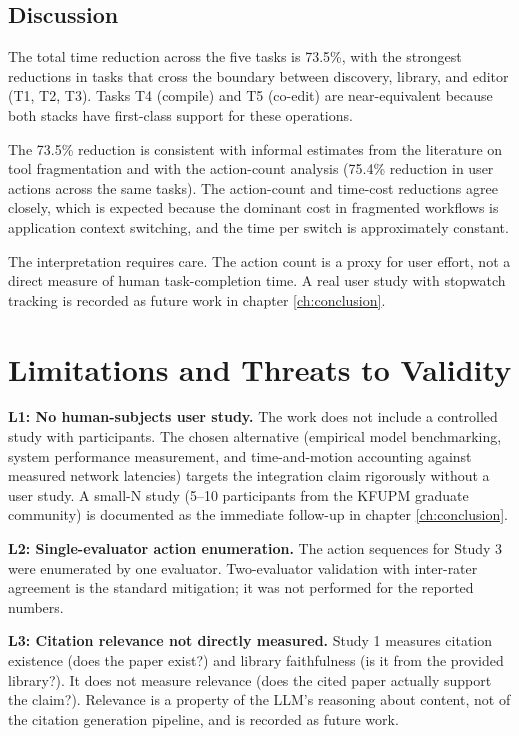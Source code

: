 \subsection{Discussion}

The total time reduction across the five tasks is 73.5\%, with the strongest reductions in tasks that cross the boundary between discovery, library, and editor (T1, T2, T3). Tasks T4 (compile) and T5 (co-edit) are near-equivalent because both stacks have first-class support for these operations.

The 73.5\% reduction is consistent with informal estimates from the literature on tool fragmentation \cite{springer2024fragmentation, khalifa2024aiwriting} and with the action-count analysis (75.4\% reduction in user actions across the same tasks). The action-count and time-cost reductions agree closely, which is expected because the dominant cost in fragmented workflows is application context switching, and the time per switch is approximately constant.

The interpretation requires care. The action count is a proxy for user effort, not a direct measure of human task-completion time. A real user study with stopwatch tracking is recorded as future work in chapter \ref{ch:conclusion}.

\section{Limitations and Threats to Validity}
\label{sec:eval-limitations}

\textbf{L1: No human-subjects user study.} The work does not include a controlled study with participants. The chosen alternative (empirical model benchmarking, system performance measurement, and time-and-motion accounting against measured network latencies) targets the integration claim rigorously without a user study. A small-N study (5--10 participants from the KFUPM graduate community) is documented as the immediate follow-up in chapter \ref{ch:conclusion}.

\textbf{L2: Single-evaluator action enumeration.} The action sequences for Study 3 were enumerated by one evaluator. Two-evaluator validation with inter-rater agreement is the standard mitigation; it was not performed for the reported numbers.

\textbf{L3: Citation relevance not directly measured.} Study 1 measures citation existence (does the paper exist?) and library faithfulness (is it from the provided library?). It does not measure relevance (does the cited paper actually support the claim?). Relevance is a property of the LLM's reasoning about content, not of the citation generation pipeline, and is recorded as future work.

